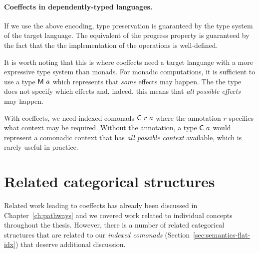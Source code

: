 \paragraph{Coeffects in dependently-typed languages.}
If we use the above encoding, type preservation is guaranteed by the type 
system of the target language. The equivalent of the progress property is guaranteed by the 
fact that the the implementation of the operations is well-defined.

It is worth noting that this is where coeffects need a target language with a more expressive
type system than monads. For monadic computations, it is sufficient to use a type $\textnormal{\sffamily M}~a$
which represents that \emph{some} effects may happen. The the type does not specify which effects
and, indeed, this means that \emph{all possible effects} may happen.

With coeffects, we need indexed comonads $\textnormal{\sffamily C}~r~a$ where the annotation $r$ specifies what
context may be required. Without the annotation, a type $\textnormal{\sffamily C}~a$ would represent a comonadic
context that has \emph{all possible context} available, which is rarely useful in practice.



%                                                 
%

\section{Related categorical structures}
\label{sec:semantics-related}

Related work leading to coeffects has already been discussed in Chapter~\ref{ch:pathways} 
and we covered work related to individual concepts throughout the thesis. However, there is a
number of related categorical structures that are related to our \emph{indexed comonads}
(Section~\ref{sec:semantics-flat-idx}) that deserve additional discussion.

